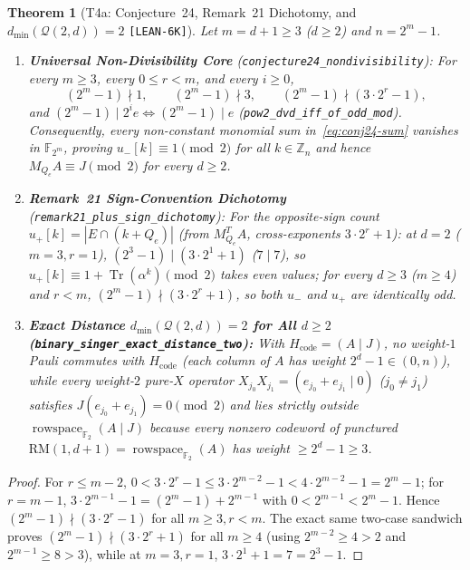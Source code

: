 \documentclass[11pt,letterpaper]{article}
\theoremstyle{plain}
\newtheorem{theorem}{Theorem}[section]
\theoremstyle{definition}
\theoremstyle{remark}
\newcommand{\F}{\mathbb{F}}
\newcommand{\Z}{\mathbb{Z}}
\newcommand{\Tr}{\operatorname{Tr}}
\newcommand{\RM}{\mathrm{RM}}
\newcommand{\Qcode}{\mathcal{Q}}
\newcommand{\rowsp}{\operatorname{rowspace}}
\newcommand{\leanref}[1]{\textnormal{\texttt{\footnotesize #1}}}
\newcommand{\tagbadge}[1]{\textnormal{\texttt{\small [#1]}}}
\begin{document}
\begin{theorem}[{T4a: Conjecture~24, Remark~21 Dichotomy, and $d_{\min}(\Qcode(2,d))=2$ \tagbadge{LEAN-6K}}]
\label{thm:t4a}
Let $m=d+1\ge 3$ ($d\ge 2$) and $n=2^m-1$.
\begin{enumerate}[leftmargin=2em,itemsep=2pt]
  \item \textbf{Universal Non-Divisibility Core} (\leanref{conjecture24\_\allowbreak nondivisibility}): For every $m\ge 3$, every $0\le r<m$, and every $i\ge 0$,
  \[
    (2^m-1)\nmid 1,\qquad (2^m-1)\nmid 3,\qquad (2^m-1)\nmid (3\cdot 2^r - 1),
  \]
  and $(2^m-1)\mid 2^i e \iff (2^m-1)\mid e$ (\leanref{pow2\_\allowbreak dvd\_\allowbreak iff\_\allowbreak of\_\allowbreak odd\_\allowbreak mod}). Consequently, every non-constant monomial sum in~\eqref{eq:conj24-sum} vanishes in $\F_{2^m}$, proving $u_-[k]\equiv 1\pmod 2$ for all $k\in\Z_n$ and hence $M_{Q_e}A\equiv J\pmod 2$ for \emph{every} $d\ge 2$.
  \item \textbf{Remark~21 Sign-Convention Dichotomy} (\leanref{remark21\_\allowbreak plus\_\allowbreak sign\_\allowbreak dichotomy}): For the opposite-sign count $u_+[k]=|E\cap(k+Q_e)|$ (from $M_{Q_e}^T A$, cross-exponents $3\cdot 2^r+1$): at $d=2$ ($m=3,r=1$), $(2^3-1)\mid(3\cdot 2^1+1)$ ($7\mid 7$), so $u_+[k]\equiv 1+\Tr(\alpha^k)\pmod 2$ takes even values; for every $d\ge 3$ ($m\ge 4$) and $r<m$, $(2^m-1)\nmid(3\cdot 2^r+1)$, so \emph{both} $u_-$ and $u_+$ are identically odd.
  \item \textbf{Exact Distance $d_{\min}(\Qcode(2,d))=2$ for All $d\ge 2$ (\leanref{binary\_\allowbreak singer\_\allowbreak exact\_\allowbreak distance\_\allowbreak two}):} With $H_{\mathrm{code}}=(A\mid J)$, no weight-$1$ Pauli commutes with $H_{\mathrm{code}}$ (each column of $A$ has weight $2^d-1\in(0,n)$), while every weight-$2$ pure-$X$ operator $X_{j_0}X_{j_1}=(e_{j_0}+e_{j_1}\mid 0)$ ($j_0\neq j_1$) satisfies $J(e_{j_0}+e_{j_1})=0\pmod 2$ and lies strictly outside $\rowsp_{\F_2}(A\mid J)$ because every nonzero codeword of punctured $\RM(1,d+1)=\rowsp_{\F_2}(A)$ has weight $\ge 2^d-1\ge 3$.
\end{enumerate}
\end{theorem}

\begin{proof}
For $r\le m-2$, $0<3\cdot 2^r-1\le 3\cdot 2^{m-2}-1 < 4\cdot 2^{m-2}-1=2^m-1$; for $r=m-1$, $3\cdot 2^{m-1}-1=(2^m-1)+2^{m-1}$ with $0<2^{m-1}<2^m-1$. Hence $(2^m-1)\nmid(3\cdot 2^r-1)$ for all $m\ge 3, r<m$. The exact same two-case sandwich proves $(2^m-1)\nmid(3\cdot 2^r+1)$ for all $m\ge 4$ (using $2^{m-2}\ge 4>2$ and $2^{m-1}\ge 8>3$), while at $m=3,r=1$, $3\cdot 2^1+1=7=2^3-1$.
\end{proof}
\end{document}
